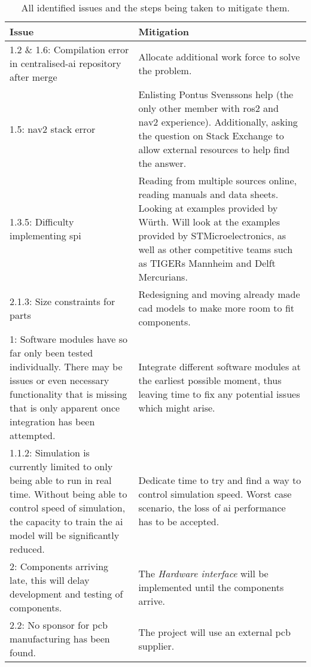 \begin{table}[H]
    \centering
    \begin{tabularx}{\columnwidth}{|X|X|} \hline
         \textbf{Issue} & \textbf{Mitigation} \\ \hline
         1.2 \& 1.6: Compilation error in centralised-ai repository after merge & Allocate additional work force to solve the problem. \\ \hline
         1.5: nav2 stack error & Enlisting Pontus Svenssons help (the only other member with \ac{ros2} and nav2 experience). Additionally, asking the question on Stack Exchange to allow external resources to help find the answer. \\ \hline
         1.3.5: Difficulty implementing \ac{spi} & Reading from multiple sources online, reading manuals and data sheets. Looking at examples provided by Würth. Will look at the examples provided by STMicroelectronics, as well as other competitive teams such as TIGERs Mannheim and Delft Mercurians. \\ \hline
         2.1.3: Size constraints for parts & Redesigning and moving already made \ac{cad} models to make more room to fit components. \\ \hline
         1: Software modules have so far only been tested individually. There may be issues or even necessary functionality that is missing that is only apparent once integration has been attempted. & Integrate different software modules at the earliest possible moment, thus leaving time to fix any potential issues which might arise. \\ \hline
         1.1.2: Simulation is currently limited to only being able to run in real time. Without being able to control speed of simulation, the capacity to train the \ac{ai} model will be significantly reduced. & Dedicate time to try and find a way to control simulation speed. Worst case scenario, the loss of \ac{ai} performance has to be accepted. \\ \hline
         2: Components arriving late, this will delay development and testing of components. & The \textit{Hardware interface} will be implemented until the components arrive. \\ \hline
         2.2: No sponsor for \ac{pcb} manufacturing has been found. & The project will use an external \ac{pcb} supplier. \\ \hline
    \end{tabularx}
    \caption{All identified issues and the steps being taken to mitigate them.}
    \label{tab:issues_and_mitigation}
\end{table}


